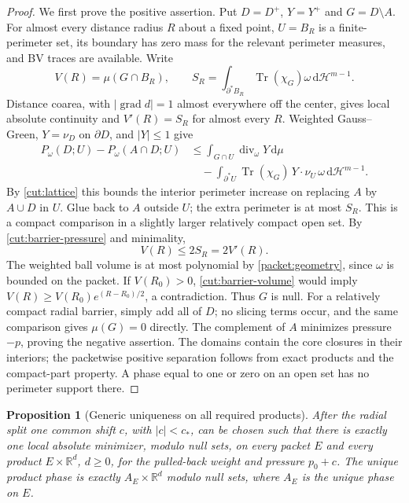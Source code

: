 \documentclass[11pt]{article}
\numberwithin{equation}{section}
\newtheorem{proposition}[theorem]{Proposition}
\theoremstyle{definition}
\theoremstyle{remark}
\begin{document}
\begin{proof}
We first prove the positive assertion.  Put $D=D^+$, $Y=Y^+$ and
$G=D\setminus A$.  For almost every distance radius $R$ about a fixed
point, $U=B_R$ is a finite-perimeter set, its boundary has zero mass for
the relevant perimeter measures, and BV traces are available.  Write
\[
 V(R)=\mu(G\cap B_R),\qquad
 S_R=\int_{\partial^*B_R}\operatorname{Tr}(\chi_G)\omega\,
                  \mathrm d\mathcal H^{m-1}.
\]
Distance coarea, with $|\operatorname{grad} d|=1$ almost everywhere off the center,
gives local absolute continuity and $V'(R)=S_R$ for almost every $R$.
Weighted Gauss--Green, $Y=\nu_D$ on $\partial D$, and $|Y|\le1$ give
\begin{align*}
 P_\omega(D;U)-P_\omega(A\cap D;U)
 &\le\int_{G\cap U}\operatorname{div}_\omega Y\,\mathrm d\mu\\
 &\quad-\int_{\partial^*U}
             \operatorname{Tr}(\chi_G)\,Y\cdot\nu_U\,
                         \omega\,\mathrm d\mathcal H^{m-1}.
\end{align*}
By \eqref{cut:lattice} this bounds the interior perimeter increase on
replacing $A$ by $A\cup D$ in $U$.  Glue back to $A$ outside $U$; the
extra perimeter is at most $S_R$.  This is a compact comparison in a
slightly larger relatively compact open set.  By
\eqref{cut:barrier-pressure} and minimality,
\begin{equation}\label{cut:barrier-volume}
                         V(R)\le2S_R=2V'(R).
\end{equation}
The weighted ball volume is at most polynomial by
\cref{packet:geometry}, since $\omega$ is bounded on the packet.
If $V(R_0)>0$, \eqref{cut:barrier-volume} would imply
$V(R)\ge V(R_0)e^{(R-R_0)/2}$, a contradiction.  Thus $G$ is null.
For a relatively compact radial barrier, simply add all of $D$; no
slicing terms occur, and the same comparison gives $\mu(G)=0$ directly.
The complement of $A$ minimizes pressure $-p$, proving the negative
assertion.  The domains contain the core closures in their interiors;
the packetwise positive separation follows from exact products and the
compact-part property.  A phase equal to one or zero on an open set has
no perimeter support there.
\end{proof}

\begin{proposition}[Generic uniqueness on all required products]
\label{cut:generic-uniqueness}
After the radial split one common shift $c$, with $|c|<c_*$, can be chosen
such that there is exactly one local absolute minimizer, modulo null
sets, on every packet $E$ and every product $E\times\mathbb R^d$, $d\ge0$, for
the pulled-back weight and pressure $p_0+c$.  The unique product phase
is exactly $A_E\times\mathbb R^d$ modulo null sets, where $A_E$ is the unique
phase on $E$.
\end{proposition}
\end{document}
